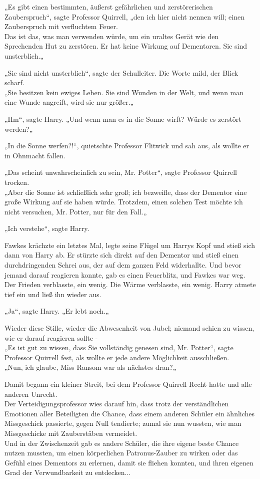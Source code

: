 {„Es gibt einen bestimmten, äußerst gefährlichen und zerstörerischen Zauberspruch“, sagte Professor Quirrell, „den ich hier nicht nennen will; einen Zauberspruch mit verfluchtem Feuer.\\ Das ist das, was man verwenden würde, um ein uraltes Gerät wie den Sprechenden Hut zu zerstören. Er hat keine Wirkung auf Dementoren. Sie sind unsterblich.„

„Sie sind nicht unsterblich“, sagte der Schulleiter. Die Worte mild, der Blick scharf.\\ „Sie besitzen kein ewiges Leben. Sie sind Wunden in der Welt, und wenn man eine Wunde angreift, wird sie nur größer.„

„Hm“, sagte Harry. „Und wenn man es in die Sonne wirft? Würde es zerstört werden?„

„In die Sonne werfen?!“, quietschte Professor Flitwick und sah aus, als wollte er in Ohnmacht fallen.

„Das scheint unwahrscheinlich zu sein, Mr. Potter“, sagte Professor Quirrell trocken.\\ „Aber die Sonne ist schließlich sehr groß; ich bezweifle, dass der Dementor eine große Wirkung auf sie haben würde. Trotzdem, einen solchen Test möchte ich nicht versuchen, Mr. Potter, nur für den Fall.„

„Ich verstehe“, sagte Harry.

Fawkes krächzte ein letztes Mal, legte seine Flügel um Harrys Kopf und stieß sich dann von Harry ab. Er stürzte sich direkt auf den Dementor und stieß einen durchdringenden Schrei aus, der auf dem ganzen Feld widerhallte. Und bevor jemand darauf reagieren konnte, gab es einen Feuerblitz, und Fawkes war weg. Der Frieden verblasste, ein wenig. Die Wärme verblasste, ein wenig. Harry atmete tief ein und ließ ihn wieder aus.

„Ja“, sagte Harry. „Er lebt noch.„

Wieder diese Stille, wieder die Abwesenheit von Jubel; niemand schien zu wissen, wie er darauf reagieren sollte -\\ „Es ist gut zu wissen, dass Sie vollständig genesen sind, Mr. Potter“, sagte Professor Quirrell fest, als wollte er jede andere Möglichkeit ausschließen.\\ „Nun, ich glaube, Miss Ransom war als nächstes dran?„

Damit begann ein kleiner Streit, bei dem Professor Quirrell Recht hatte und alle anderen Unrecht.\\ Der Verteidigungsprofessor wies darauf hin, dass trotz der verständlichen Emotionen aller Beteiligten die Chance, dass einem anderen Schüler ein ähnliches Missgeschick passierte, gegen Null tendierte; zumal sie nun wussten, wie man Missgeschicke mit Zauberstäben vermeidet.\\ Und in der Zwischenzeit gab es andere Schüler, die ihre eigene beste Chance nutzen mussten, um einen körperlichen Patronus-Zauber zu wirken oder das Gefühl eines Dementors zu erlernen, damit sie fliehen konnten, und ihren eigenen Grad der Verwundbarkeit zu entdecken...

}
